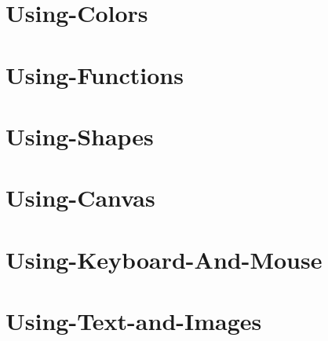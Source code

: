 \documentclass[twoside]{book}
\begin{document}
\chapter{Using-\/\-Colors}
\label{md__home_kodemonkey__desktop__t_s_g_l_docs-wiki_tutorials__using-_colors}
\hypertarget{md__home_kodemonkey__desktop__t_s_g_l_docs-wiki_tutorials__using-_colors}{}

\chapter{Using-\/\-Functions}
\label{md__home_kodemonkey__desktop__t_s_g_l_docs-wiki_tutorials__using-_functions}
\hypertarget{md__home_kodemonkey__desktop__t_s_g_l_docs-wiki_tutorials__using-_functions}{}

\chapter{Using-\/\-Shapes}
\label{md__home_kodemonkey__desktop__t_s_g_l_docs-wiki_tutorials__using-_shapes}
\hypertarget{md__home_kodemonkey__desktop__t_s_g_l_docs-wiki_tutorials__using-_shapes}{}

\chapter{Using-\/\-Canvas}
\label{md__home_kodemonkey__desktop__t_s_g_l_docs-wiki__using-_canvas}
\hypertarget{md__home_kodemonkey__desktop__t_s_g_l_docs-wiki__using-_canvas}{}

\chapter{Using-\/\-Keyboard-\/\-And-\/\-Mouse}
\label{md__home_kodemonkey__desktop__t_s_g_l_docs-wiki__using-_keyboard-_and-_mouse}
\hypertarget{md__home_kodemonkey__desktop__t_s_g_l_docs-wiki__using-_keyboard-_and-_mouse}{}

\chapter{Using-\/\-Text-\/and-\/\-Images}
\label{md__home_kodemonkey__desktop__t_s_g_l_docs-wiki__using-_text-and-_images}
\hypertarget{md__home_kodemonkey__desktop__t_s_g_l_docs-wiki__using-_text-and-_images}{}

\end{document}
